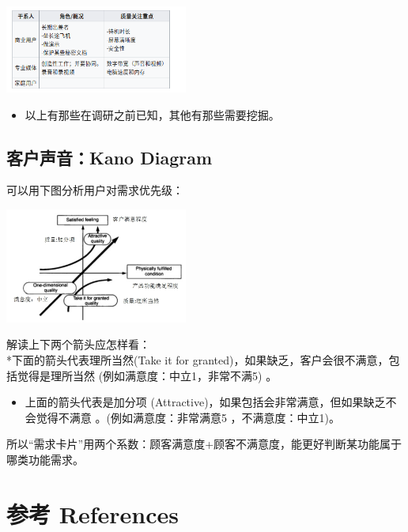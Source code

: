 
\includegraphics[width=6cm]{Screenshotfrom2023-11-0302-49-29.png}

\begin{itemize}
\tightlist
\item
  以上有那些在调研之前已知，其他有那些需要挖掘。
\end{itemize}

\hypertarget{ux5ba2ux6237ux58f0ux97f3kano-diagram}{%
\subsection{客户声音：Kano
Diagram}\label{ux5ba2ux6237ux58f0ux97f3kano-diagram}}

可以用下图分析用户对需求优先级：


\includegraphics[width=6cm]{IcKanoDiagramScreenshot_2022-12-17_1208452.jpg}

解读上下两个箭头应怎样看：\\
*下面的箭头代表理所当然(Take it for
granted)，如果缺乏，客户会很不满意，包括觉得是理所当然
(例如满意度：中立1，非常不满5) 。

\begin{itemize}
\tightlist
\item
  上面的箭头代表是加分项
  (Attractive)，如果包括会非常满意，但如果缺乏不会觉得不满意
  。(例如满意度：非常满意5 ，不满意度：中立1)。
\end{itemize}

所以``需求卡片''用两个系数：顾客满意度+顾客不满意度，能更好判断某功能属于哪类功能需求。

\hypertarget{ux9644ux4ef6}{%
\section{参考 References}\label{ux9644ux4ef6}}

